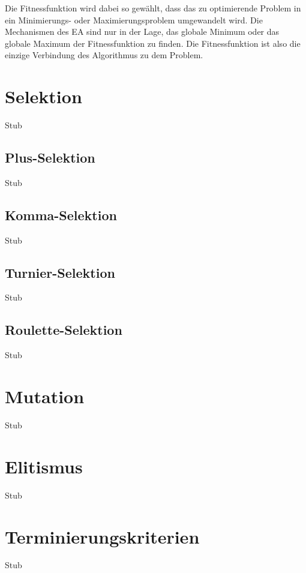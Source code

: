 Die Fitnessfunktion wird dabei so gewählt, dass das zu optimierende Problem in ein Minimierungs- oder Maximierungsproblem umgewandelt wird. Die Mechanismen des EA sind nur in der Lage, das globale Minimum oder das globale Maximum der Fitnessfunktion zu finden. Die Fitnessfunktion ist also die einzige Verbindung des Algorithmus zu dem Problem. 

\section{Selektion}
Stub

\subsection{Plus-Selektion}
Stub

\subsection{Komma-Selektion}
Stub

\subsection{Turnier-Selektion}
Stub

\subsection{Roulette-Selektion}
Stub

\section{Mutation}
Stub

\section{Elitismus}
Stub

\section{Terminierungskriterien}
Stub






























